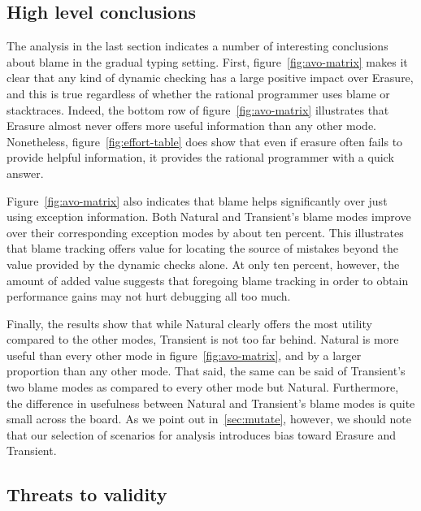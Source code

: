\subsection{High level conclusions}

The analysis in the last section indicates a number of interesting conclusions about blame in the gradual typing setting.
First, figure~\ref{fig:avo-matrix} makes it clear that any kind of dynamic checking has a large positive impact over Erasure, and this is true regardless of whether the rational programmer uses blame or stacktraces.
Indeed, the bottom row of figure~\ref{fig:avo-matrix} illustrates that Erasure almost never offers more useful information than any other mode.
Nonetheless, figure~\ref{fig:effort-table} does show that even if erasure often fails to provide helpful information, it provides the rational programmer with a quick answer.

Figure~\ref{fig:avo-matrix} also indicates that blame helps significantly over just using exception information.
Both Natural and Transient's blame modes improve over their corresponding exception modes by about ten percent.
This illustrates that blame tracking offers value for locating the source of mistakes beyond the value provided by the dynamic checks alone.
At only ten percent, however, the amount of added value suggests that foregoing blame tracking in order to obtain performance gains may not hurt debugging all too much.

Finally, the results show that while Natural clearly offers the most utility compared to the other modes, Transient is not too far behind.
Natural is more useful than every other mode in figure~\ref{fig:avo-matrix}, and by a larger proportion than any other mode.
That said, the same can be said of Transient's two blame modes as compared to every other mode but Natural.
Furthermore, the difference in usefulness between Natural and Transient's blame modes is quite small across the board.
As we point out in~\ref{sec:mutate}, however, we should note that our selection of scenarios for analysis introduces bias toward Erasure and Transient.


\subsection{Threats to validity}

